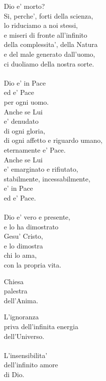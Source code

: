 \begin{haiku}
    Dio e' morto?\\
    Si, perche', forti della scienza,\\
    lo riduciamo a noi stessi,\\
    e miseri di fronte all'infinito\\
    della complessita', della Natura\\
    e del male generato dall'uomo,\\
    ci duoliamo della nostra sorte.\\
    \leavevmode\\
    Dio e' in Pace\\
    ed e' Pace\\
    per ogni uomo.\\
    Anche se Lui\\
    e' denudato\\
    di ogni gloria,\\
    di ogni affetto e riguardo umano,\\
    eternamente e' Pace.\\
    Anche se Lui\\
    e' emarginato e rifiutato,\\
    stabilmente, incessabilmente,\\
    e' in Pace\\
    ed e' Pace.\\
    \leavevmode\\
    Dio e' vero e presente,\\
    e lo ha dimostrato\\
    Gesu' Cristo,\\
    e lo dimostra\\
    chi lo ama,\\
    con la propria vita.\\
\end{haiku}

\begin{haiku}
    Chiesa\\
    palestra\\
    dell'Anima.\\
\end{haiku}

\begin{haiku}
    L'ignoranza\\
    priva dell'infinita energia\\
    dell'Universo.\\
    \leavevmode\\
    L'insensibilita'\\
    dell'infinito amore\\
    di Dio.\\
\end{haiku}

